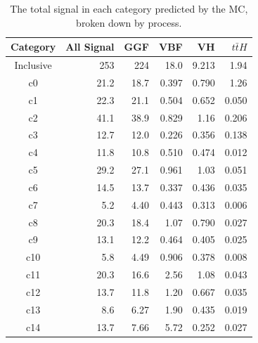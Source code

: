 \begin{table}[htb]
    \caption[Expected signal in each category.]{The total signal in each category predicted by the MC, broken down by process.}
  \begin{center}
    \begin{tabular}{crrrrr}
     \hline
      Category     & All Signal &     GGF     &     VBF      &    VH       & $t\bar{t}H$ \\  %
      \hline
      Inclusive    &    253     &     224     &     18.0     &    9.213    &    1.94      \\
      c0           &    21.2    &     18.7    &     0.397    &    0.790    &    1.26      \\ 
      c1           &    22.3    &     21.1    &     0.504    &    0.652    &    0.050     \\ 
      c2           &    41.1    &     38.9    &     0.829    &    1.16     &    0.206     \\ 
      c3           &    12.7    &     12.0    &     0.226    &    0.356    &    0.138     \\ 
      c4           &    11.8    &     10.8    &     0.510    &    0.474    &    0.012     \\ 
      c5           &    29.2    &     27.1    &     0.961    &    1.03     &    0.051     \\ 
      c6           &    14.5    &     13.7    &     0.337    &    0.436    &    0.035     \\ 
      c7           &    5.2     &     4.40    &     0.443    &    0.313    &    0.006     \\ 
      c8           &    20.3    &     18.4    &     1.07     &    0.790    &    0.027     \\ 
      c9           &    13.1    &     12.2    &     0.464    &    0.405    &    0.025     \\ 
      c10          &    5.8     &     4.49    &     0.906    &    0.378    &    0.008     \\ 
      c11          &    20.3    &     16.6    &     2.56     &    1.08     &    0.043     \\ 
      c12          &    13.7    &     11.8    &     1.20     &    0.667    &    0.035     \\ 
      c13          &    8.6     &     6.27    &     1.90     &    0.435    &    0.019     \\ 
      c14          &    13.7    &     7.66    &     5.72     &    0.252    &    0.027     \\ 
      \hline
    \end{tabular}
  \end{center}
  \label{tab:sig_yields_table}
\end{table}


